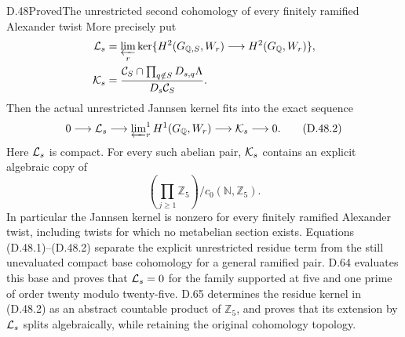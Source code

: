 \begin{statement}{D.48}{Proved}{The unrestricted second cohomology of every finitely ramified Alexander twist}
More precisely put
\[
 \begin{split}
 {\cal L}_s&=
  \varprojlim_r\ker\{H^2(G_{\mathbb Q,S},W_r)
                              \longrightarrow
                         H^2(G_{\mathbb Q},W_r)\},\\
 {\cal K}_s&=
 \frac{{\cal C}_S\cap
             \prod_{q\notin S}D_{s,q}\Lambda}
      {D_s{\cal C}_S}.
 \end{split}
\]
Then the actual unrestricted Jannsen kernel
fits into the exact sequence
\[
 0\longrightarrow{\cal L}_s
  \longrightarrow
       \varprojlim\nolimits_r^1H^1(G_{\mathbb Q},W_r)
  \longrightarrow{\cal K}_s
  \longrightarrow0.                                           \tag{D.48.2}
\]
Here \({\cal L}_s\) is compact. For every such
abelian pair, \({\cal K}_s\) contains an explicit
algebraic copy of
\[
           \left(\prod_{j\ge1}\mathbb Z_5\right)
                             \big/c_0(\mathbb N,\mathbb Z_5).
                                                               \tag{D.48.3}
\]
In particular the Jannsen kernel is nonzero
for every finitely ramified Alexander twist,
including twists for which no metabelian
section exists. Equations (D.48.1)--(D.48.2)
separate the explicit unrestricted residue
term from the still unevaluated compact
base cohomology for a general ramified pair.
D.64 evaluates this base and proves that
\({\cal L}_s=0\) for the family supported at
five and one prime of order twenty modulo
twenty-five. D.65 determines the residue kernel
in (D.48.2) as an abstract countable product
of \(\mathbb Z_5\), and proves that its extension
by \({\cal L}_s\) splits algebraically, while
retaining the original cohomology topology.
\end{statement}
